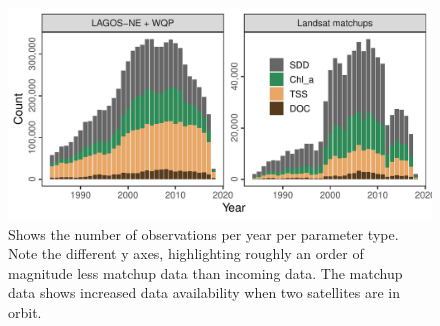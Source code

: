 \documentclass[]{article}
\begin{document}
\begin{figure}
\centering
\includegraphics{AquaSat_SI_files/figure-latex/time-1.pdf}
\caption{\label{fig:time} Shows the number of observations per year per
parameter type. Note the different y axes, highlighting roughly an order
of magnitude less matchup data than incoming data. The matchup data
shows increased data availability when two satellites are in orbit.}
\end{figure}
\end{document}
